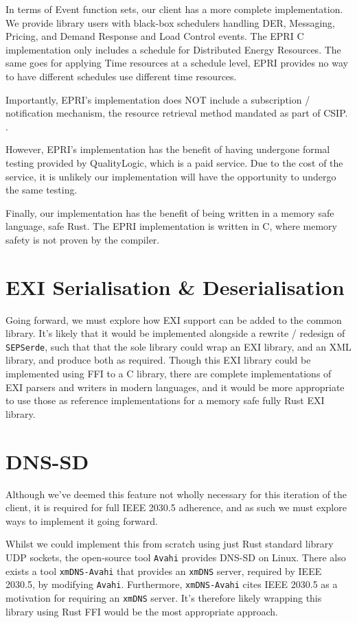 In terms of Event function sets, our client has a more complete implementation. We provide library users with black-box schedulers handling DER, Messaging, Pricing, and Demand Response and Load Control events. The EPRI C implementation only includes a schedule for Distributed Energy Resources. The same goes for applying Time resources at a schedule level, EPRI provides no way to have different schedules use different time resources.

Importantly, EPRI's implementation does NOT include a subscription / notification mechanism, the resource retrieval method mandated as part of CSIP. \cite{20305workshop}. 

However, EPRI's implementation has the benefit of having undergone formal testing provided by QualityLogic, which is a paid service. Due to the cost of the service, it is unlikely our implementation will have the opportunity to undergo the same testing.

Finally, our implementation has the benefit of being written in a memory safe language, safe Rust. The EPRI implementation is written in C, where memory safety is not proven by the compiler.

\section{EXI Serialisation \& Deserialisation}
Going forward, we must explore how EXI support can be added to the common library. It's likely that it would be implemented alongside a rewrite / redesign of \texttt{SEPSerde}, such that that the sole library could wrap an EXI library, and an XML library, and produce both as required.
Though this EXI library could be implemented using FFI to a C library, there are complete implementations of EXI parsers and writers in modern languages, and it would be more appropriate to use those as reference implementations for a memory safe fully Rust EXI library. \cite{exijs}

\section{DNS-SD}
Although we've deemed this feature not wholly necessary for this iteration of the client, it is required for full IEEE 2030.5 adherence, and as such we must explore ways to implement it going forward. 

Whilst we could implement this from scratch using just Rust standard library UDP sockets, the open-source tool \texttt{Avahi} provides DNS-SD on Linux. There also exists a tool \texttt{xmDNS-Avahi} that provides an \texttt{xmDNS} server, required by IEEE 2030.5, by modifying \texttt{Avahi}. Furthermore, \texttt{xmDNS-Avahi} cites IEEE 2030.5 as a motivation for requiring an \texttt{xmDNS} server. 
It's therefore likely wrapping this library using Rust FFI would be the most appropriate approach. \cite{avahi} \cite{xmdnsavahi} 

